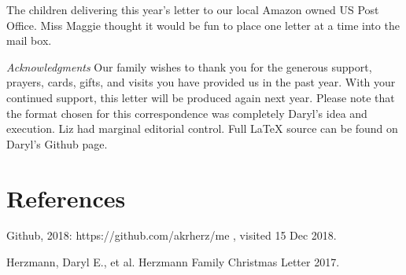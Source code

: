 \documentclass[letterpaper,11pt]{article}
\makeatletter
\def\refer{\par\noindent\hangindent\parindent\hangafter1}
\newenvironment{figurehere}
  {\def\@captype{figure}}
  {}
\makeatother
\begin{document}
\begin{multicols}{2}
\bigskip
\begin{figurehere}
 \centering   
 \caption{The children delivering this year's letter to our local Amazon owned
 US Post Office. Miss Maggie thought it would be fun to place one letter at 
 a time into the mail box.}
\end{figurehere}

\bigskip
  \emph{Acknowledgments} Our family wishes to thank you for the generous 
support, prayers, cards, gifts, and visits you have provided us in the past
year. With your continued support, this letter will be produced again
next year. Please note that the format chosen for this
correspondence was completely Daryl's idea and execution. Liz had marginal
editorial control. Full \LaTeX\xspace source can be found on Daryl's Github
page.

\section{References}

\refer Github, 2018: https://github.com/akrherz/me , visited 15 Dec 2018.
\refer Herzmann, Daryl E., et al. Herzmann Family Christmas Letter 2017. 

\end{multicols}
\end{document}
